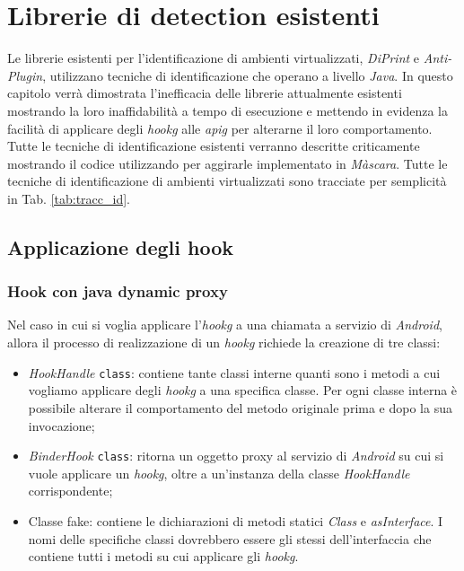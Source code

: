 
\chapter{Librerie di detection esistenti}
\label{chap:lib_esis}

Le librerie esistenti per l'identificazione di ambienti virtualizzati, \emph{DiPrint}\cite{DiPrint} e \emph{Anti-Plugin}\cite{Antiplugin}, utilizzano tecniche di identificazione che operano a livello \emph{Java}.
In questo capitolo verrà dimostrata l'inefficacia delle librerie attualmente esistenti mostrando la loro inaffidabilità a tempo di esecuzione e mettendo in evidenza la facilità di applicare degli \emph{\gls{hookg}} alle \emph{\gls{apig}} per alterarne il loro comportamento. Tutte le tecniche di identificazione esistenti verranno descritte criticamente mostrando il codice utilizzando per aggirarle implementato in \emph{Màscara}.
Tutte le tecniche di identificazione di ambienti virtualizzati sono tracciate per semplicità in Tab. \ref{tab:tracc_id}.

\newpage



\section{Applicazione degli hook}

\subsection*{Hook con java dynamic proxy}

Nel caso in cui si voglia applicare l'\emph{\gls{hookg}} a una chiamata a servizio di \emph{Android}, allora il processo di realizzazione di un \emph{\gls{hookg}} richiede la creazione di tre classi:

\begin{itemize}
    \item \emph{HookHandle} \texttt{class}: contiene tante classi interne quanti sono i metodi a cui vogliamo applicare degli \emph{\gls{hookg}} a una specifica classe. Per ogni classe interna è possibile alterare il comportamento del metodo originale prima e dopo la sua invocazione;
    \item \emph{BinderHook} \texttt{class}:  ritorna un oggetto proxy al servizio di \emph{Android} su cui si vuole applicare un \emph{\gls{hookg}}, oltre a un'instanza della classe \emph{HookHandle} corrispondente;
    \item Classe fake: contiene le dichiarazioni di metodi statici \emph{Class} e \emph{asInterface}. I nomi delle specifiche classi dovrebbero essere gli stessi dell'interfaccia che contiene tutti i metodi su cui applicare gli \emph{\gls{hookg}}.
\end{itemize}


